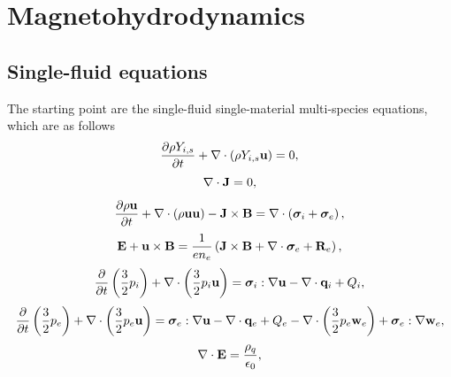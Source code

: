 \documentclass[a4paper,11pt]{report}
\begin{document}
\chapter{Magnetohydrodynamics}
\section{Single-fluid equations}
The starting point are the single-fluid single-material multi-species equations, which are as follows 
\begin{equation}
    \label{eq:sf_sm_ms_ni}
    \frac{\partial \rho Y_{i,s}}{\partial t} + \nabla \cdot \left( \rho Y_{i,s} \mathbf{u} \right) = 0,
\end{equation}
\begin{equation}
    \label{eq:sf_sm_ms_ne}
    \nabla \cdot \mathbf{J} = 0,
\end{equation}
\begin{equation}
    \label{eq:sf_sm_ms_ui}
    \frac{\partial \rho \mathbf{u}}{\partial t} + \nabla \cdot \left( \rho \mathbf{u} \mathbf{u} \right) - \mathbf{J} \times \mathbf{B} = \nabla \cdot \left( \bm \sigma_i + \bm \sigma_e \right),
\end{equation}
\begin{equation}
    \label{eq:sf_sm_ms_ue}
    \mathbf{E} + \mathbf{u} \times \mathbf{B} = \frac{1}{e n_e} \left( \mathbf{J} \times \mathbf{B} + \nabla \cdot \bm \sigma_e + \mathbf{R}_e \right) ,
\end{equation}
\begin{equation}
    \label{eq:sf_sm_ms_iei}
    \frac{\partial}{\partial t} \left( \frac{3}{2} p_i \right) + \nabla \cdot \left( \frac{3}{2} p_i \mathbf{u} \right) = \bm \sigma_i : \nabla \mathbf{u} - \nabla \cdot \mathbf{q}_i + Q_i,
\end{equation}
\begin{equation}
    \label{eq:sf_sm_ms_iee}
    \frac{\partial}{\partial t} \left( \frac{3}{2} p_e \right) + \nabla \cdot \left( \frac{3}{2} p_e \mathbf{u} \right) = \bm \sigma_e : \nabla \mathbf{u} - \nabla \cdot \mathbf{q}_e + Q_e - \nabla \cdot \left( \frac{3}{2} p_e \mathbf{w}_e \right) + \bm \sigma_e : \nabla \mathbf{w}_e,
\end{equation}
\begin{equation}
    \label{eq:sf_sm_ms_maxwell_3}
    \nabla \cdot \mathbf{E} = \frac{\rho_q}{\epsilon_0},
\end{equation}
\end{document}
